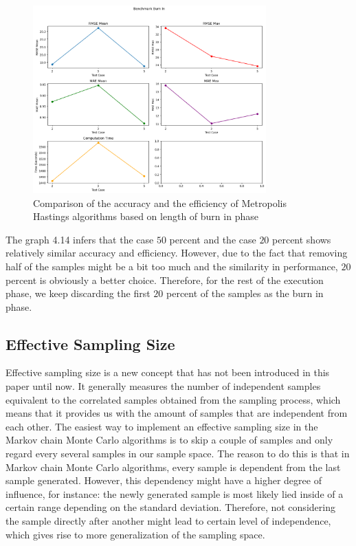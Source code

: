 \begin{figure}
    \centering
    \includegraphics[width=0.8\textwidth]{figures/basic_mh/benchmark/burnin_factor.png}
    \captionsetup{width=.8\textwidth}
    \caption{Comparison of the accuracy and the efficiency of Metropolis Hastings algorithms based on length of burn in phase}
    \label{fig:enter-label}
\end{figure}

The graph 4.14 infers that the case $50$ percent and the case $20$ percent shows relatively similar accuracy and efficiency. However, due to the fact that removing half of the samples might be a bit too much and the similarity in performance, $20$ percent is obviously a better choice. Therefore, for the rest of the execution phase, we keep discarding the first $20$ percent of the samples as the burn in phase.

\subsection{Effective Sampling Size}
Effective sampling size is a new concept that has not been introduced in this paper until now. It generally measures the number of independent samples equivalent to the correlated samples obtained from the sampling process, which means that it provides us with the amount of samples that are independent from each other. The easiest way to implement an effective sampling size in the Markov chain Monte Carlo algorithms is to skip a couple of samples and only regard every several samples in our sample space. The reason to do this is that in Markov chain Monte Carlo algorithms, every sample is dependent from the last sample generated. However, this dependency might have a higher degree of influence, for instance: the newly generated sample is most likely lied inside of a certain range depending on the standard deviation. Therefore, not considering the sample directly after another might lead to certain level of independence, which gives rise to more generalization of the sampling space. 

